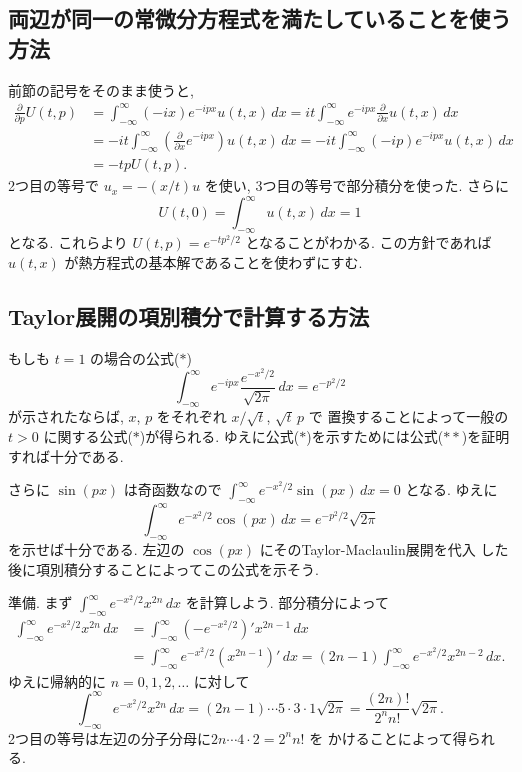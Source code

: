 \documentclass[12pt,twoside]{jarticle}
\renewcommand\d{\partial}
\theoremstyle{jplain}
\theoremstyle{jplain}
\theoremstyle{jplain}
\numberwithin{theorem}{section}
\numberwithin{equation}{section}
\numberwithin{figure}{section}
\numberwithin{table}{section}
\begin{document}

\subsection{両辺が同一の常微分方程式を満たしていることを使う方法}

前節の記号をそのまま使うと,
\begin{align*}
\frac{\d}{\d p}U(t,p)
&=\int_{-\infty}^\infty (-ix)e^{-ipx}u(t,x)\,dx
=it\int_{-\infty}^\infty e^{-ipx}\frac{\d}{\d x}u(t,x)\,dx
\\ &
=-it\int_{-\infty}^\infty \left(\frac{\d}{\d x}e^{-ipx}\right)u(t,x)\,dx
=-it\int_{-\infty}^\infty (-ip)e^{-ipx}u(t,x)\,dx
\\ &
=-tp U(t,p).
\end{align*}
2つ目の等号で $u_x=-(x/t)u$ を使い,
3つ目の等号で部分積分を使った.
さらに
\[
U(t,0)=\int_{-\infty}^\infty u(t,x)\,dx=1
\]
となる. これらより $U(t,p)=e^{-tp^2/2}$ となることがわかる.
この方針であれば $u(t,x)$ が熱方程式の基本解であることを使わずにすむ.


\subsection{Taylor展開の項別積分で計算する方法}

もしも $t=1$ の場合の公式($*$)
\[
\int_{-\infty}^\infty e^{-ipx} \frac{e^{-x^2/2}}{\sqrt{2\pi}}\,dx = e^{-p^2/2}
\tag{$**$}
\]
が示されたならば,
$x$, $p$ をそれぞれ $x/\sqrt{t}$, $\sqrt{t}\,p$ で
置換することによって一般の $t>0$ に関する公式($*$)が得られる.
ゆえに公式($*$)を示すためには公式($**$)を証明すれば十分である.

さらに $\sin(px)$ は奇函数なので
$\int_{-\infty}^\infty e^{-x^2/2} \sin(px)\,dx=0$ となる.
ゆえに
\[
\int_{-\infty}^\infty e^{-x^2/2}\cos(px)\,dx=e^{-p^2/2}\sqrt{2\pi}
\]
を示せば十分である. 左辺の $\cos(px)$ にそのTaylor-Maclaulin展開を代入
した後に項別積分することによってこの公式を示そう.

準備. まず $\int_{-\infty}^\infty e^{-x^2/2}x^{2n}\,dx$ を計算しよう.
部分積分によって
\begin{align*}
\int_{-\infty}^\infty e^{-x^2/2} x^{2n}\,dx
&=
\int_{-\infty}^\infty \left(-e^{-x^2/2}\right)' x^{2n-1}\,dx
\\ &
=\int_{-\infty}^\infty e^{-x^2/2} (x^{2n-1})'\,dx
=(2n-1)\int_{-\infty}^\infty e^{-x^2/2} x^{2n-2}\,dx.
\end{align*}
ゆえに帰納的に $n=0,1,2,\ldots$ に対して
\[
\int_{-\infty}^\infty e^{-x^2/2} x^{2n}\,dx
=(2n-1)\cdots 5\cdot 3\cdot 1\sqrt{2\pi}
=\frac{(2n)!}{2^n n!}\sqrt{2\pi}.
\]
2つ目の等号は左辺の分子分母に$2n\cdots 4\cdot 2=2^n n!$ を
かけることによって得られる.
\end{document}
